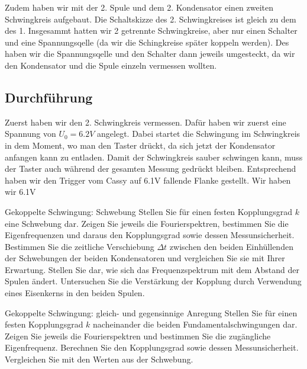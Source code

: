 \documentclass[twoside]{protokoll}
\begin{document}
Zudem haben wir mit der 2. Spule und dem 2. Kondensator einen zweiten Schwingkreis aufgebaut.
Die Schaltskizze des 2. Schwingkreises ist gleich zu dem des 1.
Insgesammt hatten wir 2 getrennte Schwingkreise, aber nur einen Schalter und eine Spannungsqelle (da wir die Schingkreise später koppeln werden).
Des haben wir die Spannungsqelle und den Schalter dann jeweils umgesteckt, da wir den Kondensator und die Spule einzeln vermessen wollten.


\subsection{Durchführung}
Zuerst haben wir den 2. Schwingkreis vermessen.
Dafür haben wir zuerst eine Spannung von $U_0 = 6.2V$ angelegt.
Dabei startet die Schwingung im Schwingkreis in dem Moment, wo man den Taster drückt, da sich jetzt der Kondensator anfangen kann zu entladen.
Damit der Schwingkreis sauber schwingen kann, muss der Taster auch während der gesamten Messung gedrückt bleiben.
Entsprechend haben wir den Trigger vom Cassy auf 6.1V fallende Flanke gestellt. Wir haben wir 6.1V

\begin{aufgabe}{Gekoppelte Schwingung: Schwebung}
  Stellen Sie für einen festen Kopplungsgrad $k$ eine Schwebung
  dar. Zeigen Sie jeweils die Fourierspektren, bestimmen Sie die
  Eigenfrequenzen und daraus den Kopplungsgrad sowie dessen
  Messunsicherheit. Bestimmen Sie die zeitliche Verschiebung
  $\Delta{}t$ zwischen den beiden Einhüllenden der Schwebungen der
  beiden Kondensatoren und vergleichen Sie sie mit Ihrer
  Erwartung. Stellen Sie dar, wie sich das Frequenzspektrum mit dem
  Abstand der Spulen ändert. Untersuchen Sie die Verstärkung der
  Kopplung durch Verwendung eines Eisenkerns in den beiden Spulen.
\end{aufgabe}


\begin{aufgabe}{Gekoppelte Schwingung: gleich- und gegensinnige Anregung}
  Stellen Sie für einen festen Kopplungsgrad $k$ nacheinander die
  beiden Fundamentalschwingungen dar. Zeigen Sie jeweils die
  Fourierspektren und bestimmen Sie die zugängliche
  Eigenfrequenz. Berechnen Sie den Kopplungsgrad sowie dessen
  Messunsicherheit. Vergleichen Sie mit den Werten aus der Schwebung.
\end{aufgabe}
   
   
\end{document}
